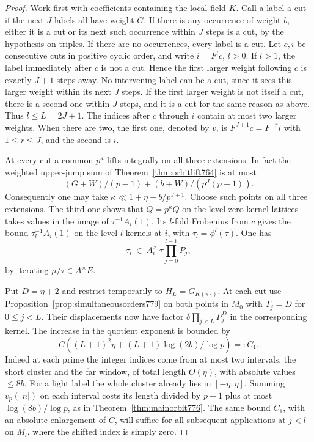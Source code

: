 \documentclass[a4paper,11pt]{article}
\theoremstyle{definition}
\theoremstyle{remark}
\numberwithin{equation}{section}
\begin{document}
\begin{proof}
Work first with coefficients containing the local field
\(K\). Call a label a cut if the next \(J\) labels all
have weight \(G\). If there is any occurrence of weight
\(b\), either it is a cut or its next such occurrence
within \(J\) steps is a cut, by the hypothesis on triples.
If there are no occurrences, every label is a cut.
Let \(c,i\) be consecutive cuts in positive cyclic order,
and write \(i=F^l c\), \(l>0\).
If \(l>1\), the label immediately after \(c\) is not a
cut. Hence the first larger weight following \(c\) is
exactly \(J+1\) steps away. No intervening label can
be a cut, since it sees this larger weight within its
next \(J\) steps. If the first larger weight is not
itself a cut, there is a second one within \(J\) steps,
and it is a cut for the same reason as above. Thus
\(l\le L=2J+1\). The indices after \(c\) through \(i\)
contain at most two larger weights. When there are two,
the first one, denoted by \(v\), is \(F^{J+1}c=F^{-r}i\)
with \(1\le r\le J\), and the second is \(i\).

At every cut a common \(p^\kappa\) lifts integrally on
all three extensions. In fact the weighted upper-jump
sum of Theorem~\ref{thm:orbitlift764} is at most
\[
       (G+W)/(p-1)+(b+W)/(p^J(p-1)).
\]
Consequently one may take \(\kappa\ll1+\eta+b/p^{J+1}\).
Choose such points on all three extensions. The third
one shows that \(\widetilde Q=p^\kappa Q\) on the level
zero kernel lattices takes values in the image of
\(\tau^{-1}A_i(1)\). Its \(l\)-fold Frobenius from \(c\)
gives the bound \(\tau_l^{-1}A_i(1)\) on the level
\(l\) kernels at \(i\), with \(\tau_l=\phi^l(\tau)\).
One has
\[
       \tau_l\ \in\ A_i^\times\,\tau\prod_{j=0}^{l-1}P_j ,
\]
by iterating \(\mu/\tau\in A^\times E\).

Put \(D=\eta+2\) and restrict temporarily to
\(H_L=G_{K(\pi_L)}\).
At each cut use Proposition~\ref{prop:simultaneousorders779}
on both points in \(M_0\) with \(T_j=D\) for
\(0\le j<L\). Their displacements now have factor
\(\delta\prod_{j<L}P_j^D\) in the corresponding kernel.
The increase in the quotient exponent is bounded by
\[
       C\left((L+1)^2\eta+
                       (L+1)\log(2b)/\log p\right)=:C_1 .
\]
Indeed at each prime the integer indices come from at
most two intervals, the short cluster and the far window,
of total length \(O(\eta)\), with absolute values
\(\le 8b\). For a light label the whole cluster already
lies in \([-\eta,\eta]\). Summing \(v_p(|n|)\) on each
interval costs its length divided by \(p-1\) plus at
most \(\log(8b)/\log p\), as in
Theorem~\ref{thm:mainorbit776}. The same bound \(C_1\),
with an absolute enlargement of \(C\), will suffice
for all subsequent applications at \(j<l\) on \(M_l\),
where the shifted index is simply zero.


\end{proof}
\end{document}
